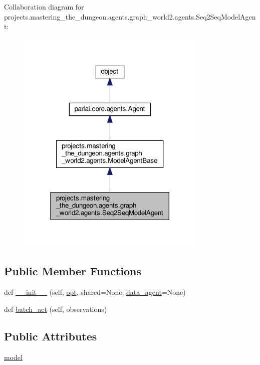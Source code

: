 Collaboration diagram for projects.\+mastering\+\_\+the\+\_\+dungeon.\+agents.\+graph\+\_\+world2.\+agents.\+Seq2\+Seq\+Model\+Agent\+:
\nopagebreak
\begin{figure}[H]
\begin{center}
\leavevmode
\includegraphics[width=257pt]{classprojects_1_1mastering__the__dungeon_1_1agents_1_1graph__world2_1_1agents_1_1Seq2SeqModelAgent__coll__graph}
\end{center}
\end{figure}
\subsection*{Public Member Functions}
\begin{DoxyCompactItemize}
\item 
def \hyperlink{classprojects_1_1mastering__the__dungeon_1_1agents_1_1graph__world2_1_1agents_1_1Seq2SeqModelAgent_a355995e11c4f10e710dab06afa743373}{\+\_\+\+\_\+init\+\_\+\+\_\+} (self, \hyperlink{classparlai_1_1core_1_1agents_1_1Agent_ab3b45d2754244608c75d4068b90cd051}{opt}, shared=None, \hyperlink{classprojects_1_1mastering__the__dungeon_1_1agents_1_1graph__world2_1_1agents_1_1ModelAgentBase_a229b7901e20dced7e3b3c3e2d381d2ce}{data\+\_\+agent}=None)
\item 
def \hyperlink{classprojects_1_1mastering__the__dungeon_1_1agents_1_1graph__world2_1_1agents_1_1Seq2SeqModelAgent_a4a6f60aa35a0fcf6e033cf2fef28342b}{batch\+\_\+act} (self, observations)
\end{DoxyCompactItemize}
\subsection*{Public Attributes}
\begin{DoxyCompactItemize}
\item 
\hyperlink{classprojects_1_1mastering__the__dungeon_1_1agents_1_1graph__world2_1_1agents_1_1Seq2SeqModelAgent_a97c080f3159cacb53bf3bd35109029d6}{model}
\end{DoxyCompactItemize}



